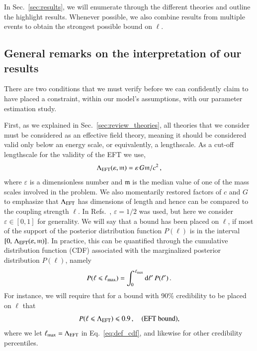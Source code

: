 \documentclass[twocolumn,
               prd,
               aps,
               superscriptaddress,
               tightenlines,
               nofootinbib,
               eqsecnum,
               amsfonts,
               amsmath,
               longbibliography]{revtex4-1}
\newcommand{\dd}{{\rm d}}
\newcommand{\hs}[1]{{\textcolor{blue}{{[HS: #1]}} }}
\begin{document}
In Sec.~\ref{sec:results}, we will enumerate through the different theories and
outline the highlight results. Whenever possible, we also combine results from
multiple events to obtain the strongest possible bound on $\ell$.



\subsection{General remarks on the interpretation of our results}
\label{sec:remarks}

There are two conditions that we must verify before we can confidently claim to
have placed a constraint, within our model's assumptions, with our parameter
estimation study.

First, as we explained in Sec.~\ref{sec:review_theories}, all theories that we
consider must be considered as an effective field theory, meaning it should be
considered valid only below an energy scale, or equivalently, a lengthscale.
%
As a cut-off lengthscale for the validity of the EFT we use,
%
\begin{equation}
\Lambda_{\rm EFT} (\varepsilon, \mathfrak{m}) = \varepsilon \, G \mathfrak{m} / c^2 \,,
\label{eq:def_cutoff}
\end{equation}
%
where $\varepsilon$ is a dimensionless number and $\mathfrak{m}$ is the median
value of one of the mass scales involved in the problem.
%
We also momentarily restored factors of $c$ and $G$ to emphasize that $\Lambda_{\rm EFT}$ has
dimensions of length and hence can be compared to the coupling strength $\ell$.
%
In Refs.~\cite{Nair:2019iur,Perkins:2021mhb,Lyu:2022gdr}, $\varepsilon = 1/2$ was used,
but here we consider $\varepsilon \in [0, 1]$ for generality.
%
We will say that a bound has been placed on $\ell$, if most of the support of
the posterior distribution function $P(\ell)$ is in the interval
$[0, \, \Lambda_{\rm EFT}(\varepsilon, \mathfrak{m})]$.
%
In practice, this can be quantified through the cumulative distribution function
(CDF) associated with the marginalized posterior distribution $P(\ell)$, namely
%
\begin{equation}
P(\ell \leqslant \ell_{\rm max}) = \int_{0}^{\,\ell_{\rm max}} \dd \ell'\, P(\ell') \,.
\label{eq:def_cdf}
\end{equation}
%
For instance, we will require that for a bound with 90\% credibility to be placed on $\ell$ that
%
\begin{equation}
P(\ell \leqslant \Lambda_{\rm EFT}) \leqslant 0.9 \,,
\quad \textrm{(EFT bound)},
\label{eq:eft_bound}
\end{equation}
%
where we let $\ell_{\rm max} = \Lambda_{\rm EFT}$ in Eq.~\eqref{eq:def_cdf}, and
likewise for other credibility percentiles.
\end{document}
